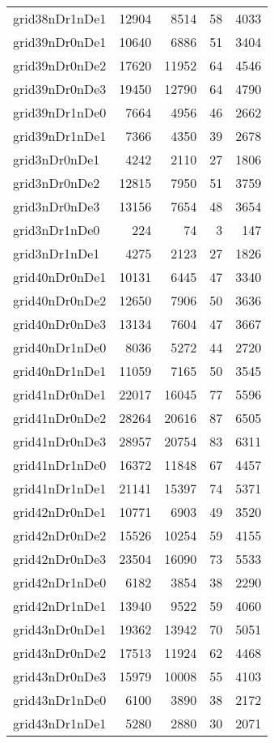 \begin{longtable}{lrrrr}
grid38nDr1nDe1 & 12904 & 8514 & 58 & 4033 \\
grid39nDr0nDe1 & 10640 & 6886 & 51 & 3404 \\
grid39nDr0nDe2 & 17620 & 11952 & 64 & 4546 \\
grid39nDr0nDe3 & 19450 & 12790 & 64 & 4790 \\
grid39nDr1nDe0 & 7664 & 4956 & 46 & 2662 \\
grid39nDr1nDe1 & 7366 & 4350 & 39 & 2678 \\
grid3nDr0nDe1 & 4242 & 2110 & 27 & 1806 \\
grid3nDr0nDe2 & 12815 & 7950 & 51 & 3759 \\
grid3nDr0nDe3 & 13156 & 7654 & 48 & 3654 \\
grid3nDr1nDe0 & 224 & 74 & 3 & 147 \\
grid3nDr1nDe1 & 4275 & 2123 & 27 & 1826 \\
grid40nDr0nDe1 & 10131 & 6445 & 47 & 3340 \\
grid40nDr0nDe2 & 12650 & 7906 & 50 & 3636 \\
grid40nDr0nDe3 & 13134 & 7604 & 47 & 3667 \\
grid40nDr1nDe0 & 8036 & 5272 & 44 & 2720 \\
grid40nDr1nDe1 & 11059 & 7165 & 50 & 3545 \\
grid41nDr0nDe1 & 22017 & 16045 & 77 & 5596 \\
grid41nDr0nDe2 & 28264 & 20616 & 87 & 6505 \\
grid41nDr0nDe3 & 28957 & 20754 & 83 & 6311 \\
grid41nDr1nDe0 & 16372 & 11848 & 67 & 4457 \\
grid41nDr1nDe1 & 21141 & 15397 & 74 & 5371 \\
grid42nDr0nDe1 & 10771 & 6903 & 49 & 3520 \\
grid42nDr0nDe2 & 15526 & 10254 & 59 & 4155 \\
grid42nDr0nDe3 & 23504 & 16090 & 73 & 5533 \\
grid42nDr1nDe0 & 6182 & 3854 & 38 & 2290 \\
grid42nDr1nDe1 & 13940 & 9522 & 59 & 4060 \\
grid43nDr0nDe1 & 19362 & 13942 & 70 & 5051 \\
grid43nDr0nDe2 & 17513 & 11924 & 62 & 4468 \\
grid43nDr0nDe3 & 15979 & 10008 & 55 & 4103 \\
grid43nDr1nDe0 & 6100 & 3890 & 38 & 2172 \\
grid43nDr1nDe1 & 5280 & 2880 & 30 & 2071 \\

\end{longtable}

